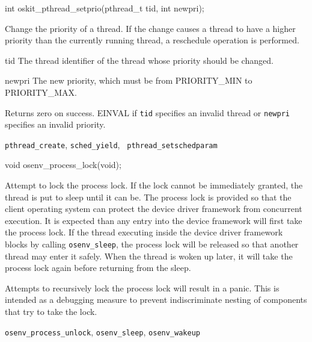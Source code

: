 \begin{apisyn}

	\funcproto int oskit_pthread_setprio(pthread_t tid, int newpri);
\end{apisyn}
\begin{apidesc}
	Change the priority of a thread. If the change causes a thread to
	have a higher priority than the currently running thread, a
	reschedule operation is performed.
\end{apidesc}
\begin{apiparm}
	\item[tid]
		The thread identifier of the thread whose priority should
		be changed.
	\item[newpri]
		The new priority, which must be from PRIORITY_MIN to
		PRIORITY_MAX.
\end{apiparm}
\begin{apiret}
	Returns zero on success. EINVAL if {\tt tid} specifies an invalid
	thread or {\tt newpri} specifies an invalid priority.
\end{apiret}
\begin{apirel}
	{\tt pthread_create}, {\tt sched_yield}, {\tt
	pthread_setschedparam}
\end{apirel}



\begin{apisyn}

	\funcproto void osenv_process_lock(void);
\end{apisyn}
\begin{apidesc}
	Attempt to lock the process lock. If the lock cannot be immediately
	granted, the thread is put to sleep until it can be. The process
	lock is provided so that the client operating system can protect
	the device driver framework from concurrent execution. It is
	expected than any entry into the device framework will first take
	the process lock. If the thread executing inside the device driver
	framework blocks by calling {\tt osenv_sleep}, the process lock
	will be released so that another thread may enter it safely. When
	the thread is woken up later, it will take the process lock again
	before returning from the sleep.

	Attempts to recursively lock the process lock will result in a
	panic. This is intended as a debugging measure to prevent
	indiscriminate nesting of components that try to take the lock.
\end{apidesc}
\begin{apirel}
	{\tt osenv_process_unlock}, {\tt osenv_sleep}, {\tt osenv_wakeup}
\end{apirel}

